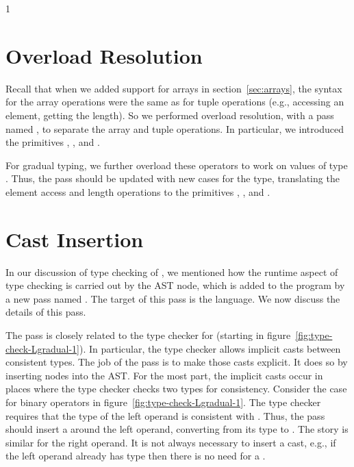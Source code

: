 \documentclass[7x10]{TimesAPriori_MIT}%
\def\pythonEd{1}
\def\edition{0}
\numberwithin{theorem}{chapter}
\numberwithin{definition}{chapter}
\numberwithin{equation}{chapter}
\begin{document}
{\if\edition\pythonEd
\section{Overload Resolution}
\label{sec:gradual-resolution}

Recall that when we added support for arrays in
section~\ref{sec:arrays}, the syntax for the array operations were the
same as for tuple operations (e.g., accessing an element, getting the
length). So we performed overload resolution, with a pass named
, to separate the array and tuple operations.  In
particular, we introduced the primitives ,
, and .

For gradual typing, we further overload these operators to work on
values of type \CANYTY{}. Thus, the  pass should be
updated with new cases for the \CANYTY{} type, translating the element
access and length operations to the primitives ,
, and .


\section{Cast Insertion}
\label{sec:gradual-insert-casts}

In our discussion of type checking of \LangGrad{}, we mentioned how
the runtime aspect of type checking is carried out by the 
AST node, which is added to the program by a new pass named
. The target of this pass is the \LangCast{}
language.  We now discuss the details of this pass.

The  pass is closely related to the type checker
for \LangGrad{} (starting in figure~\ref{fig:type-check-Lgradual-1}).
In particular, the type checker allows implicit casts between
consistent types. The job of the  pass is to make
those casts explicit. It does so by inserting
 nodes into the AST.
%
For the most part, the implicit casts occur in places where the type
checker checks two types for consistency.  Consider the case for
binary operators in figure~\ref{fig:type-check-Lgradual-1}. The type
checker requires that the type of the left operand is consistent with
\INTTY{}. Thus, the  pass should insert a
 around the left operand, converting from its type to
\INTTY{}. The story is similar for the right operand. It is not always
necessary to insert a cast, e.g., if the left operand already has type
\INTTY{} then there is no need for a .

}
\end{document}
